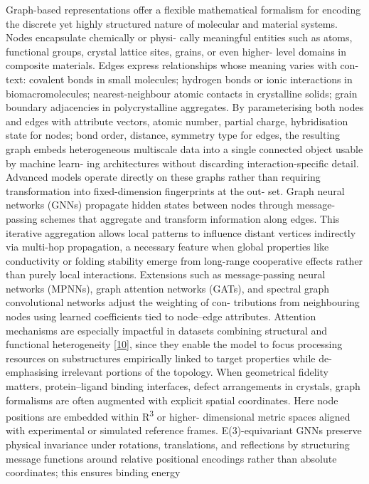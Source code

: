 \documentclass[
]{article}
\begin{document}
Graph-based representations offer a flexible mathematical formalism for
encoding the discrete yet highly structured nature of molecular and
material systems. Nodes encapsulate chemically or physi- cally
meaningful entities such as atoms, functional groups, crystal lattice
sites, grains, or even higher- level domains in composite materials.
Edges express relationships whose meaning varies with con- text:
covalent bonds in small molecules; hydrogen bonds or ionic interactions
in biomacromolecules; nearest-neighbour atomic contacts in crystalline
solids; grain boundary adjacencies in polycrystalline aggregates. By
parameterising both nodes and edges with attribute vectors, atomic
number, partial charge, hybridisation state for nodes; bond order,
distance, symmetry type for edges, the resulting graph embeds
heterogeneous multiscale data into a single connected object usable by
machine learn- ing architectures without discarding interaction-specific
detail. Advanced models operate directly on these graphs rather than
requiring transformation into fixed-dimension fingerprints at the out-
set. Graph neural networks (GNNs) propagate hidden states between nodes
through message-passing schemes that aggregate and transform information
along edges. This iterative aggregation allows local patterns to
influence distant vertices indirectly via multi-hop propagation, a
necessary feature when global properties like conductivity or folding
stability emerge from long-range cooperative effects rather than purely
local interactions. Extensions such as message-passing neural networks
(MPNNs), graph attention networks (GATs), and spectral graph
convolutional networks adjust the weighting of con- tributions from
neighbouring nodes using learned coefficients tied to node--edge
attributes. Attention mechanisms are especially impactful in datasets
combining structural and functional heterogeneity
{[}\hyperref[_bookmark50]{10}{]}, since they enable the model to focus
processing resources on substructures empirically linked to target
properties while de-emphasising irrelevant portions of the topology.
When geometrical fidelity matters, protein--ligand binding interfaces,
defect arrangements in crystals, graph formalisms are often augmented
with explicit spatial coordinates. Here node positions are embedded
within R\textsuperscript{3} or higher- dimensional metric spaces aligned
with experimental or simulated reference frames. E(3)-equivariant GNNs
preserve physical invariance under rotations, translations, and
reflections by structuring message functions around relative positional
encodings rather than absolute coordinates; this ensures binding energy
\end{document}
